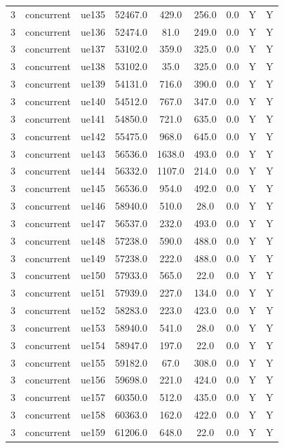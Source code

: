 \begin{table}[ht]
\begin{tabular}{|c|c|c|c|c|c|c|c|c|}
3 & concurrent & ue135 & 52467.0 & 429.0 & 256.0 & 0.0 & Y & Y \\
3 & concurrent & ue136 & 52474.0 & 81.0 & 249.0 & 0.0 & Y & Y \\
3 & concurrent & ue137 & 53102.0 & 359.0 & 325.0 & 0.0 & Y & Y \\
3 & concurrent & ue138 & 53102.0 & 35.0 & 325.0 & 0.0 & Y & Y \\
3 & concurrent & ue139 & 54131.0 & 716.0 & 390.0 & 0.0 & Y & Y \\
3 & concurrent & ue140 & 54512.0 & 767.0 & 347.0 & 0.0 & Y & Y \\
3 & concurrent & ue141 & 54850.0 & 721.0 & 635.0 & 0.0 & Y & Y \\
3 & concurrent & ue142 & 55475.0 & 968.0 & 645.0 & 0.0 & Y & Y \\
3 & concurrent & ue143 & 56536.0 & 1638.0 & 493.0 & 0.0 & Y & Y \\
3 & concurrent & ue144 & 56332.0 & 1107.0 & 214.0 & 0.0 & Y & Y \\
3 & concurrent & ue145 & 56536.0 & 954.0 & 492.0 & 0.0 & Y & Y \\
3 & concurrent & ue146 & 58940.0 & 510.0 & 28.0 & 0.0 & Y & Y \\
3 & concurrent & ue147 & 56537.0 & 232.0 & 493.0 & 0.0 & Y & Y \\
3 & concurrent & ue148 & 57238.0 & 590.0 & 488.0 & 0.0 & Y & Y \\
3 & concurrent & ue149 & 57238.0 & 222.0 & 488.0 & 0.0 & Y & Y \\
3 & concurrent & ue150 & 57933.0 & 565.0 & 22.0 & 0.0 & Y & Y \\
3 & concurrent & ue151 & 57939.0 & 227.0 & 134.0 & 0.0 & Y & Y \\
3 & concurrent & ue152 & 58283.0 & 223.0 & 423.0 & 0.0 & Y & Y \\
3 & concurrent & ue153 & 58940.0 & 541.0 & 28.0 & 0.0 & Y & Y \\
3 & concurrent & ue154 & 58947.0 & 197.0 & 22.0 & 0.0 & Y & Y \\
3 & concurrent & ue155 & 59182.0 & 67.0 & 308.0 & 0.0 & Y & Y \\
3 & concurrent & ue156 & 59698.0 & 221.0 & 424.0 & 0.0 & Y & Y \\
3 & concurrent & ue157 & 60350.0 & 512.0 & 435.0 & 0.0 & Y & Y \\
3 & concurrent & ue158 & 60363.0 & 162.0 & 422.0 & 0.0 & Y & Y \\
3 & concurrent & ue159 & 61206.0 & 648.0 & 22.0 & 0.0 & Y & Y \\

\end{tabular}
\end{table}
